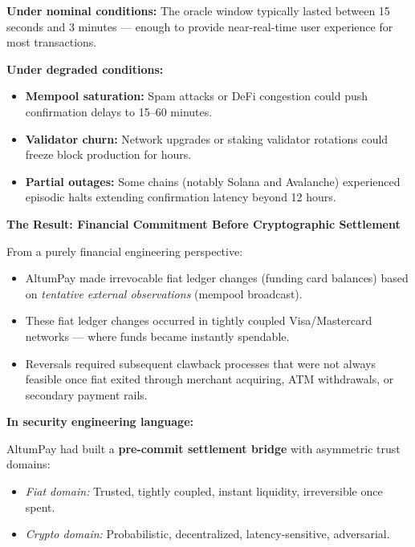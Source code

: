 \bigskip

\textbf{Under nominal conditions:}  
The oracle window typically lasted between 15 seconds and 3 minutes — enough to provide near-real-time user experience for most transactions.

\textbf{Under degraded conditions:}

\begin{itemize}
  \item \textbf{Mempool saturation:} Spam attacks or DeFi congestion could push confirmation delays to 15--60 minutes.
  \item \textbf{Validator churn:} Network upgrades or staking validator rotations could freeze block production for hours.
  \item \textbf{Partial outages:} Some chains (notably Solana and Avalanche) experienced episodic halts extending confirmation latency beyond 12 hours.
\end{itemize}

\bigskip

\textbf{The Result: Financial Commitment Before Cryptographic Settlement}

From a purely financial engineering perspective:

\begin{itemize}
  \item AltumPay made irrevocable fiat ledger changes (funding card balances) based on \emph{tentative external observations} (mempool broadcast).
  \item These fiat ledger changes occurred in tightly coupled Visa/Mastercard networks — where funds became instantly spendable.
  \item Reversals required subsequent clawback processes that were not always feasible once fiat exited through merchant acquiring, ATM withdrawals, or secondary payment rails.
\end{itemize}

\bigskip

\textbf{In security engineering language:}

AltumPay had built a \textbf{pre-commit settlement bridge} with asymmetric trust domains:

\begin{itemize}
  \item \emph{Fiat domain:} Trusted, tightly coupled, instant liquidity, irreversible once spent.
  \item \emph{Crypto domain:} Probabilistic, decentralized, latency-sensitive, adversarial.
\end{itemize}

